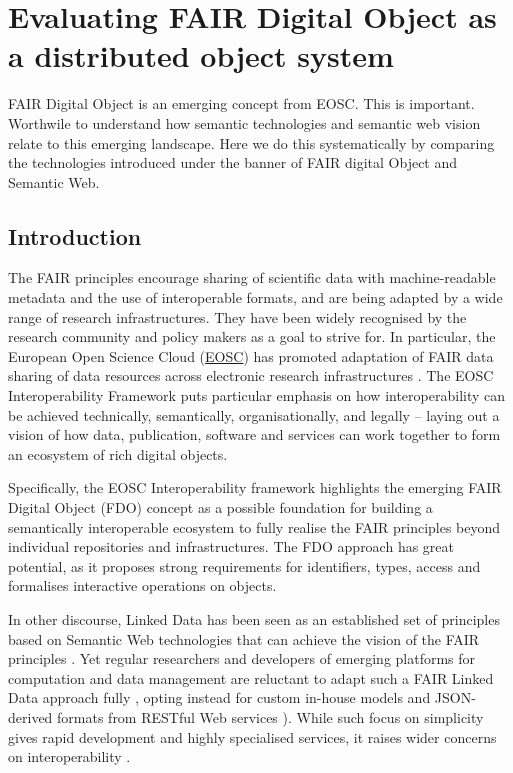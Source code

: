 \section{Evaluating FAIR Digital Object as a distributed object system}

FAIR Digital Object is an emerging concept from EOSC. This is important. Worthwile to understand how semantic technologies and semantic web vision relate to this emerging landscape. Here we do this systematically by comparing the technologies introduced under the banner of FAIR digital Object and Semantic Web.

\hypertarget{ch3:introduction}{%
\subsection{Introduction}\label{ch3:introduction}}

The FAIR principles \cite{wilkinsonFAIRGuidingPrinciples2016e} encourage sharing of scientific data with machine-readable metadata and the use of interoperable formats, and are being adapted by a wide range of research infrastructures. They have been widely recognised by the research community and policy makers as a goal to strive for. In particular, the European Open Science Cloud (\href{https://www.eosc.eu/}{EOSC}) has promoted adaptation of FAIR data sharing of data resources across electronic research infrastructures \cite{monsCloudyIncreasinglyFAIR2017b}. The EOSC Interoperability Framework \cite{corchoEOSCInteroperabilityFramework2021b} puts particular emphasis on how interoperability can be achieved technically, semantically, organisationally, and legally -- laying out a vision of how data, publication, software and services can work together to form an ecosystem of rich digital objects.

Specifically, the EOSC Interoperability framework highlights the emerging FAIR Digital Object \cite{Schultes 2019} (FDO) concept as a possible foundation for building a semantically interoperable ecosystem to fully realise the FAIR principles beyond individual repositories and infrastructures. The FDO approach has great potential, as it proposes strong requirements for identifiers, types, access and formalises interactive operations on objects.

In other discourse, Linked Data \cite{bizerLinkedDataStory2009a} has been seen as an established set of principles based on Semantic Web technologies that can achieve the vision of the FAIR principles \cite{boninodasilvasantosFAIRDataPoints2016a,hasnainAssessingFAIRData2018a}. Yet regular researchers and developers of emerging platforms for computation and data management are reluctant to adapt such a FAIR Linked Data approach fully \cite{verborghSemanticWebIdentity2020a}, opting instead for custom in-house models and JSON-derived formats from RESTful Web services \cite{merono-penuelaConclusionFutureChallenges2021a,neumannAnalysisPublicREST2021a}). While such focus on simplicity gives rapid development and highly specialised services, it raises wider concerns on interoperability \cite{turcoaneLinkedDataJSONLD2014a,wilkinsonWorkflowsWhenParts2022b}.

